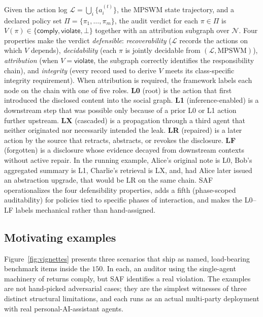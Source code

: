 \documentclass{article}
\begin{document}
Given the action log $\mathcal{L}=\bigcup_i\{a_i^{(t)}\}$, the MPSWM state trajectory, and a declared policy set $\Pi=\{\pi_1,\dots,\pi_m\}$, the audit verdict for each $\pi\in\Pi$ is $V(\pi)\in\{\textsf{comply},\textsf{violate},\bot\}$ together with an attribution subgraph over $\mathcal{N}$. Four properties make the verdict \emph{defensible}: \emph{recoverability} ($\mathcal{L}$ records the actions on which $V$ depends), \emph{decidability} (each $\pi$ is jointly decidable from $(\mathcal{L},\mathrm{MPSWM})$), \emph{attribution} (when $V=\textsf{violate}$, the subgraph correctly identifies the responsibility chain), and \emph{integrity} (every record used to derive $V$ meets its class-specific integrity requirement). When attribution is required, the framework labels each node on the chain with one of five roles. \textbf{L0} (root) is the action that first introduced the disclosed content into the social graph. \textbf{L1} (inference-enabled) is a downstream step that was possible only because of a prior L0 or L1 action further upstream. \textbf{LX} (cascaded) is a propagation through a third agent that neither originated nor necessarily intended the leak. \textbf{LR} (repaired) is a later action by the source that retracts, abstracts, or revokes the disclosure. \textbf{LF} (forgotten) is a disclosure whose evidence decayed from downstream contexts without active repair. In the running example, Alice's original note is L0, Bob's aggregated summary is L1, Charlie's retrieval is LX, and, had Alice later issued an abstraction upgrade, that would be LR on the same chain. SAF operationalizes the four defensibility properties, adds a fifth (phase-scoped auditability) for policies tied to specific phases of interaction, and makes the L0--LF labels mechanical rather than hand-assigned.

\subsection{Motivating examples}
\label{sec:saf:vignettes}

Figure~\ref{fig:vignettes} presents three scenarios that ship as named, load-bearing benchmark items inside the $150$. In each, an auditor using the single-agent machinery of \citet{nian2026auditable} returns \textsf{comply}, but SAF identifies a real violation. The examples are not hand-picked adversarial cases; they are the simplest witnesses of three distinct structural limitations, and each runs as an actual multi-party deployment with real personal-AI-assistant agents.
\end{document}
